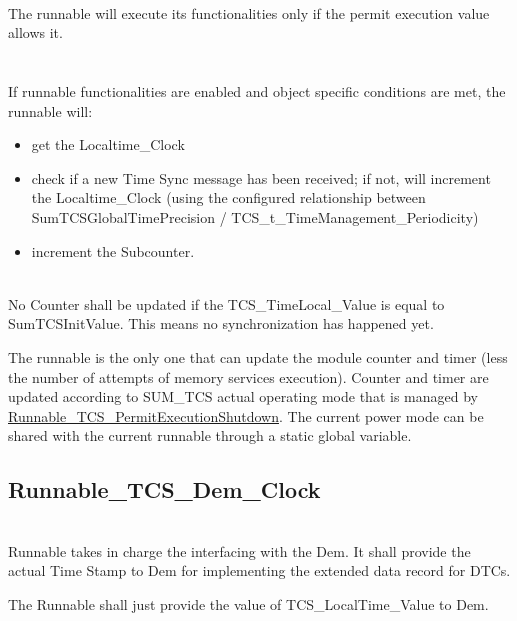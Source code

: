 

\\
The runnable will execute its functionalities only if the permit execution value allows it.
\\
{}
\\
\\
If runnable functionalities are enabled and object specific conditions are met, the runnable will:
\begin{itemize}
	\item get the Localtime_Clock
	\item check if a new Time Sync message has been received; if not, will increment the Localtime_Clock (using the configured relationship between SumTCSGlobalTimePrecision / TCS_t_TimeManagement_Periodicity)
	\item increment the Subcounter.
\end{itemize}

\\
No Counter shall be updated if the TCS_TimeLocal_Value is equal to SumTCSInitValue. This means no synchronization has happened yet. 
\\
{ }

The runnable is the only one that can update the module counter and timer (less the number of attempts of memory services execution).
Counter and timer are updated according to SUM\_TCS actual operating mode that is managed by \hyperref[subsec:Runnable_TCS_PermitExecutionShutdown]{Runnable_TCS_PermitExecutionShutdown}.
The current power mode can be shared with the current runnable through a static global variable.
\subsection{Runnable_TCS_Dem_Clock}
\label{subsec:Runnable_TCS_Dem_Clock}

\\
Runnable takes in charge the interfacing with the Dem. It shall provide the actual Time Stamp to Dem for implementing the extended data record for DTCs.
\\
{}




The Runnable shall just provide the value of TCS_LocalTime_Value to Dem.

